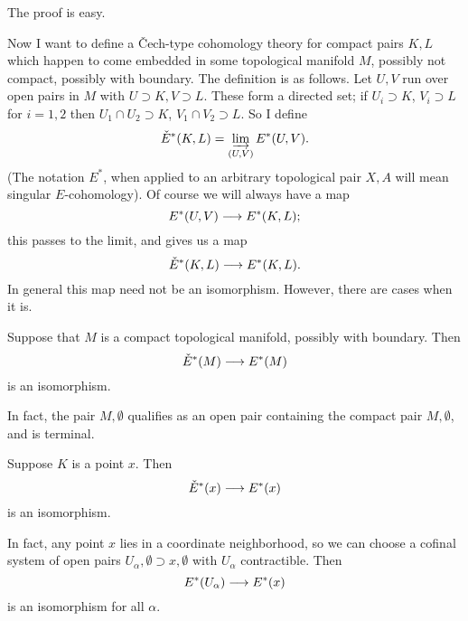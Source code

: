 \documentclass[../main]{subfiles}
\begin{document}
The proof is easy.

Now I want to define a \v{C}ech-type cohomology theory  for compact pairs $K,L$ which happen to come embedded in some topological manifold $M$, possibly not compact, possibly with boundary. The definition is as follows. Let $U,V$ run over open pairs in $M$ with $U \supset K, V \supset L$. These form a directed set; if $U_i \supset K$, $V_i \supset L$ for $i=1,2$ then $U_1 \cap U_2 \supset K$, $V_1 \cap V_2 \supset L$. So I define
\[\check{E}^*(K,L) = \varinjlim_{(U,V)} E^*(U,V).\]
(The notation $E^*$, when applied to an arbitrary topological pair $X,A$ will mean singular $E$-cohomology). Of course we will always have a map 
\[E^*(U,V) \longrightarrow E^*(K,L);\]
this passes to the limit, and gives us a map
\[\check{E}^*(K,L) \longrightarrow E^*(K,L).\]
In general this map need not be an isomorphism. However, there are cases when it is.
\begin{examples}[i]
Suppose that $M$ is a compact topological manifold, possibly with boundary. Then 
\[\check{E}^*(M) \longrightarrow E^*(M)\]
is an isomorphism.
\end{examples}
In fact, the pair $M,\emptyset$ qualifies as an open pair containing the compact pair $M,\emptyset$, and is terminal.
\begin{examples}[ii]
Suppose $K$ is a point $x$. Then 
\[\check{E}^*(x) \longrightarrow E^*(x)\]
is an isomorphism.
\end{examples}

In fact, any point $x$ lies in a coordinate neighborhood, so we can choose a cofinal system of open pairs $U_\alpha, \emptyset \supset x, \emptyset$ with $U_\alpha$ contractible. Then 
\[E^*(U_\alpha) \longrightarrow E^*(x)\]
is an isomorphism for all $\alpha$.
\end{document}
